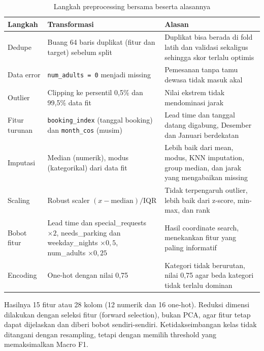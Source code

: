 \begin{table}[H]
\centering
\caption{Langkah preprocessing bersama beserta alasannya}
\label{tab:prep_bersama}
\begin{tabularx}{\textwidth}{>{\raggedright\arraybackslash}p{3.3cm}>{\raggedright\arraybackslash}p{4.7cm}X}
\toprule
Langkah & Transformasi & Alasan \\
\midrule
Dedupe & Buang 64 baris duplikat (fitur dan target) sebelum split & Duplikat bisa berada di fold latih dan validasi sekaligus sehingga skor terlalu optimis \\
Data error & \texttt{num\_adults = 0} menjadi missing & Pemesanan tanpa tamu dewasa tidak masuk akal \\
Outlier & Clipping ke persentil 0,5\% dan 99,5\% data fit & Nilai ekstrem tidak mendominasi jarak \\
Fitur turunan & \texttt{booking\_index} (tanggal booking) dan \texttt{month\_cos} (musim) & Lead time dan tanggal datang digabung, Desember dan Januari berdekatan \\
Imputasi & Median (numerik), modus (kategorikal) dari data fit & Lebih baik dari mean, modus, KNN imputation, group median, dan jarak yang mengabaikan missing \\
Scaling & Robust scaler $(x-\text{median})/\text{IQR}$ & Tidak terpengaruh outlier, lebih baik dari z-score, min-max, dan rank \\
Bobot fitur & Lead time dan special\_requests $\times2$, needs\_parking dan weekday\_nights $\times0{,}5$, num\_adults $\times0{,}25$ & Hasil coordinate search, menekankan fitur yang paling informatif \\
Encoding & One-hot dengan nilai 0,75 & Kategori tidak berurutan, nilai 0,75 agar beda kategori tidak terlalu dominan \\
\bottomrule
\end{tabularx}
\end{table}

Hasilnya 15 fitur atau 28 kolom (12 numerik dan 16 one-hot). Reduksi dimensi dilakukan dengan seleksi fitur (forward selection), bukan PCA, agar fitur tetap dapat dijelaskan dan diberi bobot sendiri-sendiri. Ketidakseimbangan kelas tidak ditangani dengan resampling, tetapi dengan memilih threshold yang memaksimalkan Macro F1.

